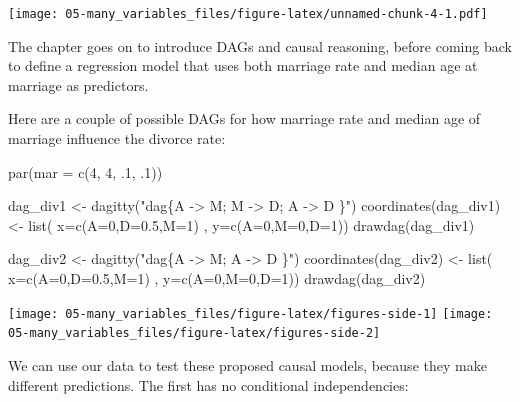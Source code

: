 \documentclass[
]{book}
\newenvironment{Shaded}{\begin{snugshade}}{\end{snugshade}}
\newcommand{\AttributeTok}[1]{\textcolor[rgb]{0.77,0.63,0.00}{#1}}
\newcommand{\DecValTok}[1]{\textcolor[rgb]{0.00,0.00,0.81}{#1}}
\newcommand{\FloatTok}[1]{\textcolor[rgb]{0.00,0.00,0.81}{#1}}
\newcommand{\FunctionTok}[1]{\textcolor[rgb]{0.00,0.00,0.00}{#1}}
\newcommand{\NormalTok}[1]{#1}
\newcommand{\OtherTok}[1]{\textcolor[rgb]{0.56,0.35,0.01}{#1}}
\newcommand{\StringTok}[1]{\textcolor[rgb]{0.31,0.60,0.02}{#1}}
\begin{document}
\texttt{[image: 05-many\_variables\_files/figure-latex/unnamed-chunk-4-1.pdf]}

The chapter goes on to introduce DAGs and causal reasoning, before coming back to define a regression model that uses both marriage rate and median age at marriage as predictors.

Here are a couple of possible DAGs for how marriage rate and median age of marriage influence the divorce rate:

\begin{Shaded}
\begin{Highlighting}[]
\FunctionTok{par}\NormalTok{(}\AttributeTok{mar =} \FunctionTok{c}\NormalTok{(}\DecValTok{4}\NormalTok{, }\DecValTok{4}\NormalTok{, .}\DecValTok{1}\NormalTok{, .}\DecValTok{1}\NormalTok{))}

\NormalTok{dag\_div1 }\OtherTok{\textless{}{-}} \FunctionTok{dagitty}\NormalTok{(}\StringTok{"dag\{A {-}\textgreater{} M; M {-}\textgreater{} D; A {-}\textgreater{} D \}"}\NormalTok{)}
\FunctionTok{coordinates}\NormalTok{(dag\_div1) }\OtherTok{\textless{}{-}} \FunctionTok{list}\NormalTok{( }\AttributeTok{x=}\FunctionTok{c}\NormalTok{(}\AttributeTok{A=}\DecValTok{0}\NormalTok{,}\AttributeTok{D=}\FloatTok{0.5}\NormalTok{,}\AttributeTok{M=}\DecValTok{1}\NormalTok{) , }\AttributeTok{y=}\FunctionTok{c}\NormalTok{(}\AttributeTok{A=}\DecValTok{0}\NormalTok{,}\AttributeTok{M=}\DecValTok{0}\NormalTok{,}\AttributeTok{D=}\DecValTok{1}\NormalTok{))}
\FunctionTok{drawdag}\NormalTok{(dag\_div1)}

\NormalTok{dag\_div2 }\OtherTok{\textless{}{-}} \FunctionTok{dagitty}\NormalTok{(}\StringTok{"dag\{A {-}\textgreater{} M; A {-}\textgreater{} D \}"}\NormalTok{)}
\FunctionTok{coordinates}\NormalTok{(dag\_div2) }\OtherTok{\textless{}{-}} \FunctionTok{list}\NormalTok{( }\AttributeTok{x=}\FunctionTok{c}\NormalTok{(}\AttributeTok{A=}\DecValTok{0}\NormalTok{,}\AttributeTok{D=}\FloatTok{0.5}\NormalTok{,}\AttributeTok{M=}\DecValTok{1}\NormalTok{) , }\AttributeTok{y=}\FunctionTok{c}\NormalTok{(}\AttributeTok{A=}\DecValTok{0}\NormalTok{,}\AttributeTok{M=}\DecValTok{0}\NormalTok{,}\AttributeTok{D=}\DecValTok{1}\NormalTok{))}
\FunctionTok{drawdag}\NormalTok{(dag\_div2)}
\end{Highlighting}
\end{Shaded}

\texttt{[image: 05-many\_variables\_files/figure-latex/figures-side-1]} \texttt{[image: 05-many\_variables\_files/figure-latex/figures-side-2]}

We can use our data to test these proposed causal models, because they make different predictions. The first has no conditional independencies:
\end{document}

